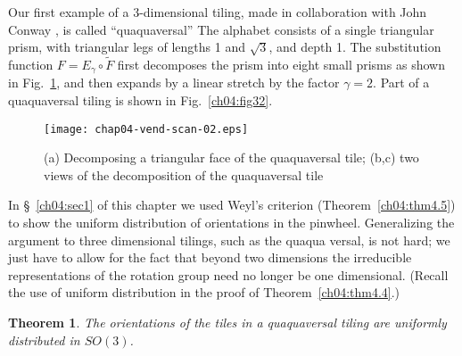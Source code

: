 \documentclass[reqno]{stml-l}
\theoremstyle{plain}
\newtheorem{theorem}{Theorem}[chapter]
\theoremstyle{definition}
\numberwithin{equation}{chapter}
\begin{document}
Our first example of a 3-dimensional tiling, made in
collaboration with John Conway \cite{bib:CoR}, is called
``quaquaversal'' The alphabet consists of a single
triangular prism, with triangular legs of lengths 1 and
$\sqrt{3}$, and depth 1. The substitution function
$F=E_{\gamma}\circ\tilde{F}$ first decomposes the prism
into eight small prisms as shown in Fig.~\ref{ch04:fig31},
and then expands by a linear stretch by the factor
$\gamma=2$. Part of a quaquaversal
tiling is shown in
Fig.~\ref{ch04:fig32}.
\begin{figure}[h]
\texttt{[image: chap04-vend-scan-02.eps]}
\caption{(a) Decomposing a triangular face of the quaquaversal tile;
(b,c) two views of the decomposition of the quaquaversal
tile}
\label{ch04:fig31}
\end{figure}

In \S~\ref{ch04:sec1} of this chapter we used Weyl's criterion (Theorem~\ref{ch04:thm4.5}) to show the uniform distribution of orientations in the pinwheel. Generalizing the argument to three dimensional tilings, such as the quaqua versal, is not hard; we just have to allow for the fact that beyond two dimensions the irreducible representations of the rotation group need no longer be one dimensional. (Recall the use of uniform distribution in the proof of Theorem~\ref{ch04:thm4.4}.)

\begin{theorem}\label{ch04:thm4.6}
The orientations of the tiles in a quaquaversal tiling are uniformly distributed in $SO(3)$.
\end{theorem}
\end{document}
